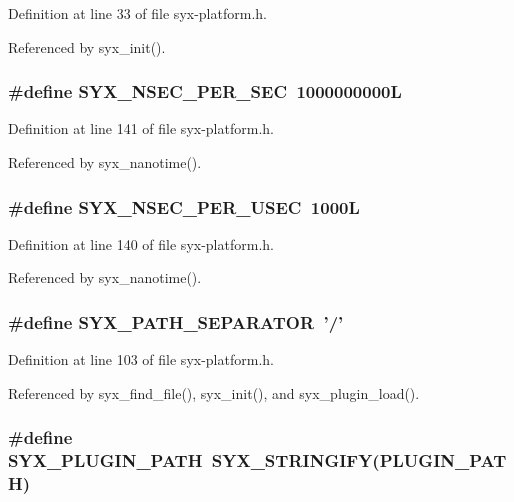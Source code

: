 Definition at line 33 of file syx-platform.h.

Referenced by syx\_\-init().\hypertarget{syx-platform_8h_e3268ffe29d61bd9abd8f17f7d4c7fa8}{
\subsubsection{\setlength{\rightskip}{0pt plus 5cm}\#define SYX\_\-NSEC\_\-PER\_\-SEC~1000000000L}}
\label{syx-platform_8h_e3268ffe29d61bd9abd8f17f7d4c7fa8}




Definition at line 141 of file syx-platform.h.

Referenced by syx\_\-nanotime().\hypertarget{syx-platform_8h_71e4e9d590e9ab780f90220d90fdf5a0}{
\subsubsection{\setlength{\rightskip}{0pt plus 5cm}\#define SYX\_\-NSEC\_\-PER\_\-USEC~1000L}}
\label{syx-platform_8h_71e4e9d590e9ab780f90220d90fdf5a0}




Definition at line 140 of file syx-platform.h.

Referenced by syx\_\-nanotime().\hypertarget{syx-platform_8h_402f4162e0a9614b60e6656f210340a2}{
\subsubsection{\setlength{\rightskip}{0pt plus 5cm}\#define SYX\_\-PATH\_\-SEPARATOR~'/'}}
\label{syx-platform_8h_402f4162e0a9614b60e6656f210340a2}




Definition at line 103 of file syx-platform.h.

Referenced by syx\_\-find\_\-file(), syx\_\-init(), and syx\_\-plugin\_\-load().\hypertarget{syx-platform_8h_69737baf997340c597dd4475c04ffd3d}{
\subsubsection{\setlength{\rightskip}{0pt plus 5cm}\#define SYX\_\-PLUGIN\_\-PATH~SYX\_\-STRINGIFY(PLUGIN\_\-PATH)}}
\label{syx-platform_8h_69737baf997340c597dd4475c04ffd3d}




